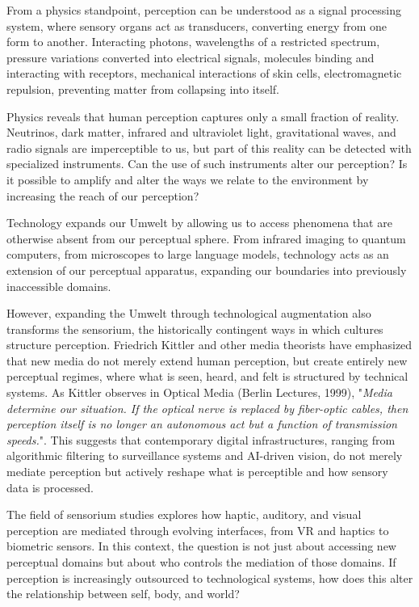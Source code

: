 From a physics standpoint, perception can be understood as a signal processing system, where sensory organs act as transducers, converting energy from one form to another. Interacting photons, wavelengths of a restricted spectrum, pressure variations converted into electrical signals, molecules binding and interacting with receptors, mechanical interactions of skin cells, electromagnetic repulsion, preventing matter from collapsing into itself.

Physics reveals that human perception captures only a small fraction of reality. Neutrinos, dark matter, infrared and ultraviolet light, gravitational waves, and radio signals are imperceptible to us, but part of this reality can be detected with specialized instruments. Can the use of such instruments alter our perception? Is it possible to amplify and alter the ways we relate to the environment by increasing the reach of our perception?

Technology expands our Umwelt by allowing us to access phenomena that are otherwise absent from our perceptual sphere. From infrared imaging to quantum computers, from microscopes to large language models, technology acts as an extension of our perceptual apparatus, expanding our boundaries into previously inaccessible domains.

However, expanding the Umwelt through technological augmentation also transforms the sensorium, the historically contingent ways in which cultures structure perception. Friedrich Kittler and other media theorists have emphasized that new media do not merely extend human perception, but create entirely new perceptual regimes, where what is seen, heard, and felt is structured by technical systems. As Kittler observes in Optical Media (Berlin Lectures, 1999), "\textit{Media determine our situation. If the optical nerve is replaced by fiber-optic cables, then perception itself is no longer an autonomous act but a function of transmission speeds.}"\citep{kittler1999}. This suggests that contemporary digital infrastructures, ranging from algorithmic filtering to surveillance systems and AI-driven vision, do not merely mediate perception but actively reshape what is perceptible and how sensory data is processed.


The field of sensorium studies explores how haptic, auditory, and visual perception are mediated through evolving interfaces, from VR and haptics to biometric sensors. In this context, the question is not just about accessing new perceptual domains but about who controls the mediation of those domains. If perception is increasingly outsourced to technological systems, how does this alter the relationship between self, body, and world?


